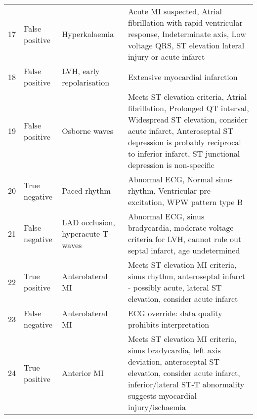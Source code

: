 \begin{longtable}[c]{Lp{0.18\textwidth}AA}
17&False positive&Hyperkalaemia&Acute MI suspected, \newline  Atrial fibrillation with rapid ventricular response, \newline  Indeterminate axis,  \newline  Low voltage QRS,  \newline  ST elevation lateral injury or acute infarct \\
18&False positive&LVH, early repolarisation&Extensive myocardial infarction \\
19&False positive&Osborne waves&Meets ST elevation criteria,  \newline  Atrial fibrillation, \newline  Prolonged QT interval,  \newline  Widespread ST elevation,  \newline  consider acute infarct,  \newline  Anteroseptal ST depression is probably reciprocal to inferior infarct, \newline  ST junctional depression is non-specific \\
20&True negative&Paced rhythm&Abnormal ECG,  \newline  Normal sinus rhythm,  \newline  Ventricular pre-excitation,  \newline  WPW pattern type B \\
21&False negative&LAD occlusion, \newline  hyperacute T-waves&Abnormal ECG, sinus bradycardia,  \newline  moderate voltage criteria for LVH,  \newline  cannot rule out septal infarct, age undetermined \\
22&True positive&Anterolateral MI&Meets ST elevation MI criteria,  \newline  sinus rhythm, anteroseptal infarct - possibly acute,  \newline  lateral ST elevation,  \newline  consider acute infarct \\
23&False negative&Anterolateral MI&ECG override: data quality prohibits interpretation \\
24&True positive&Anterior MI&Meets ST elevation MI criteria,  \newline  sinus bradycardia, \newline  left axis deviation,  \newline  anteroseptal ST elevation, \newline  consider acute infarct,  \newline  inferior\slash lateral ST-T abnormality suggests myocardial injury\slash ischaemia \\

\end{longtable}
